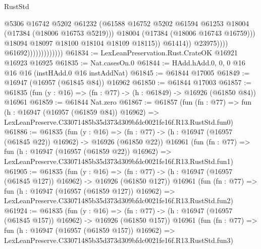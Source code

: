 \begin{lexlean}{RustStd}
\begin{coremodule}
                                                @5306
                                                @16742
                                                @5202
                                                @61232
                                                (@61588
                                                  @16752
                                                  @5202
                                                  @61594
                                                  @61253
                                                  @18004
                                                  (@17384 (@18006 @16753 @5219)))
                                                @18004
                                                (@17384 (@18006 @16743 @16759)))
                                              @18094
                                              @18097
                                              @18100
                                              @18104
                                              @18109
                                              @18115))
                                          @61414))
                                      @23975))))
                              @61692)))))))))))))
@61834 := LexLeanPreservation.Rust.CrateOK @16921 @16923 @16925
@61835 := Nat.casesOn.{0}
@61844 := HAdd.hAdd.{0, 0, 0} @16 @16 @16 (instHAdd.{0} @16 instAddNat)
@61845 := @61844 @17005
@61849 := @16947 (@16957 (@61845 @84)) @16962
@61850 := @61844 @17003
@61857 := @61835 (fun (y : @16) => (fn : @77) -> (h : @61849) -> @16926 (@61850 @84)) @16961
@61859 := @61844 Nat.zero
@61867 := @61857
    (fun (fn : @77) =>
    fun (h : @16947 (@16957 (@61859 @84)) @16962) =>
    LexLeanPreserve.C33071485b35d373d309bfdc0021fe16f.R13.RustStd.fun0)
@61886 := @61835
    (fun (y : @16) =>
    (fn : @77) -> (h : @16947 (@16957 (@61845 @22)) @16962) -> @16926 (@61850 @22))
    @16961
    (fun (fn : @77) =>
    fun (h : @16947 (@16957 (@61859 @22)) @16962) =>
    LexLeanPreserve.C33071485b35d373d309bfdc0021fe16f.R13.RustStd.fun1)
@61905 := @61835
    (fun (y : @16) =>
    (fn : @77) -> (h : @16947 (@16957 (@61845 @127)) @16962) -> @16926 (@61850 @127))
    @16961
    (fun (fn : @77) =>
    fun (h : @16947 (@16957 (@61859 @127)) @16962) =>
    LexLeanPreserve.C33071485b35d373d309bfdc0021fe16f.R13.RustStd.fun2)
@61924 := @61835
    (fun (y : @16) =>
    (fn : @77) -> (h : @16947 (@16957 (@61845 @157)) @16962) -> @16926 (@61850 @157))
    @16961
    (fun (fn : @77) =>
    fun (h : @16947 (@16957 (@61859 @157)) @16962) =>
    LexLeanPreserve.C33071485b35d373d309bfdc0021fe16f.R13.RustStd.fun3)

\end{coremodule}
\end{lexlean}
